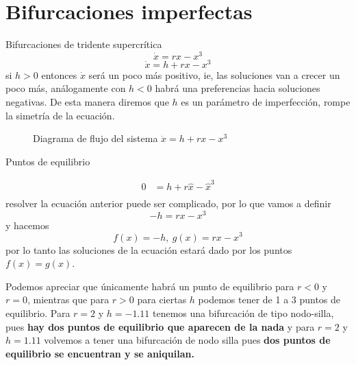 \section{Bifurcaciones imperfectas}

\begin{tcolorbox}[colback=Black!4, colframe=White]
\begin{recordatorio}
    Bifurcaciones de tridente supercrítica  
    $$
  \dot{x}= rx-x^{3}   
    $$
    $$
    \dot{x}=h+rx-x^{3}
    $$
    si $h>0$ entonces  $\dot{x}$ será un poco más positivo, ie, las soluciones van a crecer un poco más, análogamente con $h<0$ habrá una preferencias hacia soluciones negativas. De esta manera diremos que  $h$ es un parámetro de imperfección, rompe la simetría de la ecuación.
\end{recordatorio}
\end{tcolorbox}
 \begin{figure}[ht]
    \centering
      \label{fig:bifh1}
      \label{fig:bifh2}
    \caption{Diagrama de flujo del sistema $\dot{x}=h+rx-x^3$}
\end{figure}  

Puntos de equilibrio

$$
\begin{aligned}
  0 &= h+r\hat{x}-\hat{x}^3 \\
\end{aligned}
$$                            
resolver la ecuación anterior puede ser complicado, por lo que vamos a definir
$$
-h = rx-x^3
$$
y hacemos $$
f(x)=-h , \ g(x)=rx-x^3  
$$
por lo tanto las soluciones de la ecuación estará dado por los puntos $f(x)=g(x)$. \

\begin{figure}[ht]
    \centering
    \label{fig:bifurcación1}
    \label{fig:bifurcación2}
\end{figure}



Podemos apreciar que únicamente habrá un punto de equilibrio para $r<0$ y  $r=0$, mientras que para  $r>0$ para ciertas  $h$ podemos tener de 1 a 3 puntos de equilibrio. Para $r=2$ y  $h=-1.11$ tenemos una bifurcación de tipo nodo-silla, pues \textbf{hay dos puntos de equilibrio que aparecen de la nada} y para $r=2$ y  $h=1.11$ volvemos a tener una bifurcación de nodo silla pues  \textbf{dos puntos de equilibrio se encuentran y se aniquilan.}

